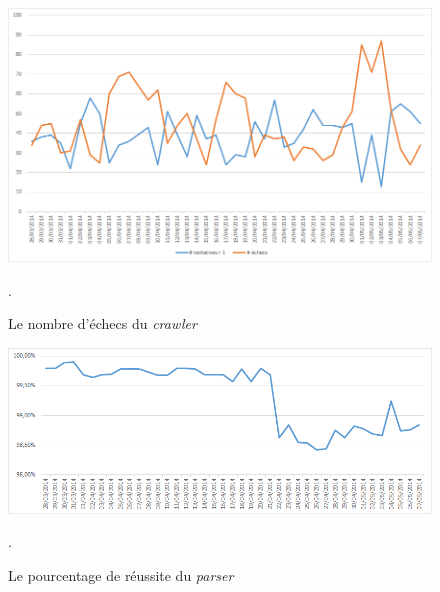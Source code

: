 \begin{figure}[h]
	\centering
	\includegraphics[scale=.7]{graphiques/Exp1_crawler_fails.png}
	\caption{\label{Exp1_crawler_fails}Le nombre d'échecs du \textit{crawler}}.
\end{figure}

\begin{figure}[h]
	\centering
	\includegraphics[scale=.8]{graphiques/Exp1_parser_success_rate.png}
	\caption{\label{Exp1_parser_success_rate}Le pourcentage de réussite du \textit{parser}}.
\end{figure}

